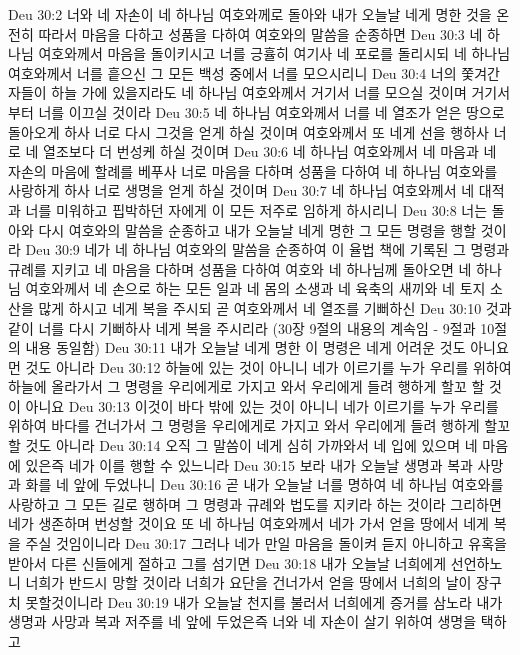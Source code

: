 Deu 30:2  너와 네 자손이 네 하나님 여호와께로 돌아와 내가 오늘날 네게 명한 것을 온전히 따라서 마음을 다하고 성품을 다하여 여호와의 말씀을 순종하면
Deu 30:3  네 하나님 여호와께서 마음을 돌이키시고 너를 긍휼히 여기사 네 포로를 돌리시되 네 하나님 여호와께서 너를 흩으신 그 모든 백성 중에서 너를 모으시리니
Deu 30:4  너의 쫓겨간 자들이 하늘 가에 있을지라도 네 하나님 여호와께서 거기서 너를 모으실 것이며 거기서부터 너를 이끄실 것이라
Deu 30:5  네 하나님 여호와께서 너를 네 열조가 얻은 땅으로 돌아오게 하사 너로 다시 그것을 얻게 하실 것이며 여호와께서 또 네게 선을 행하사 너로 네 열조보다 더 번성케 하실 것이며
Deu 30:6  네 하나님 여호와께서 네 마음과 네 자손의 마음에 할례를 베푸사 너로 마음을 다하며 성품을 다하여 네 하나님 여호와를 사랑하게 하사 너로 생명을 얻게 하실 것이며
Deu 30:7  네 하나님 여호와께서 네 대적과 너를 미워하고 핍박하던 자에게 이 모든 저주로 임하게 하시리니
Deu 30:8  너는 돌아와 다시 여호와의 말씀을 순종하고 내가 오늘날 네게 명한 그 모든 명령을 행할 것이라
Deu 30:9  네가 네 하나님 여호와의 말씀을 순종하여 이 율법 책에 기록된 그 명령과 규례를 지키고 네 마음을 다하며 성품을 다하여 여호와 네 하나님께 돌아오면 네 하나님 여호와께서 네 손으로 하는 모든 일과 네 몸의 소생과 네 육축의 새끼와 네 토지 소산을 많게 하시고 네게 복을 주시되 곧 여호와께서 네 열조를 기뻐하신
Deu 30:10  것과 같이 너를 다시 기뻐하사 네게 복을 주시리라 (30장 9절의 내용의 계속임 - 9절과 10절의 내용 동일함)
Deu 30:11  내가 오늘날 네게 명한 이 명령은 네게 어려운 것도 아니요 먼 것도 아니라
Deu 30:12  하늘에 있는 것이 아니니 네가 이르기를 누가 우리를 위하여 하늘에 올라가서 그 명령을 우리에게로 가지고 와서 우리에게 들려 행하게 할꼬 할 것이 아니요
Deu 30:13  이것이 바다 밖에 있는 것이 아니니 네가 이르기를 누가 우리를 위하여 바다를 건너가서 그 명령을 우리에게로 가지고 와서 우리에게 들려 행하게 할꼬 할 것도 아니라
Deu 30:14  오직 그 말씀이 네게 심히 가까와서 네 입에 있으며 네 마음에 있은즉 네가 이를 행할 수 있느니라
Deu 30:15  보라 내가 오늘날 생명과 복과 사망과 화를 네 앞에 두었나니
Deu 30:16  곧 내가 오늘날 너를 명하여 네 하나님 여호와를 사랑하고 그 모든 길로 행하며 그 명령과 규례와 법도를 지키라 하는 것이라 그리하면 네가 생존하며 번성할 것이요 또 네 하나님 여호와께서 네가 가서 얻을 땅에서 네게 복을 주실 것임이니라
Deu 30:17  그러나 네가 만일 마음을 돌이켜 듣지 아니하고 유혹을 받아서 다른 신들에게 절하고 그를 섬기면
Deu 30:18  내가 오늘날 너희에게 선언하노니 너희가 반드시 망할 것이라 너희가 요단을 건너가서 얻을 땅에서 너희의 날이 장구치 못할것이니라
Deu 30:19  내가 오늘날 천지를 불러서 너희에게 증거를 삼노라 내가 생명과 사망과 복과 저주를 네 앞에 두었은즉 너와 네 자손이 살기 위하여 생명을 택하고
